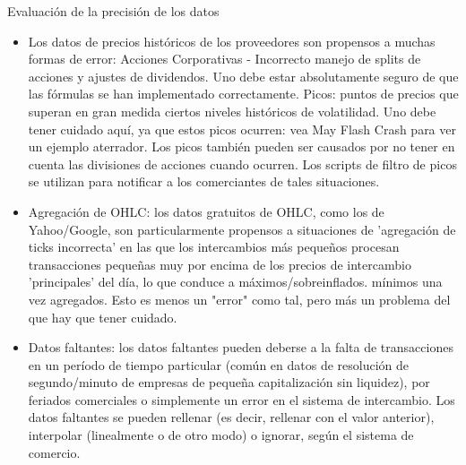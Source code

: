 \documentclass{article}
\begin{document}
 Evaluación de la precisión de los datos
\begin{itemize}
\item Los datos de precios históricos de los proveedores son propensos a muchas formas de error:
\subitem Acciones Corporativas - Incorrecto manejo de splits de acciones y ajustes de dividendos. Uno debe estar absolutamente seguro de que las fórmulas se han implementado correctamente.
\subitem Picos: puntos de precios que superan en gran medida ciertos niveles históricos de volatilidad. Uno debe tener cuidado aquí, ya que estos picos ocurren: vea May Flash Crash para ver un ejemplo aterrador. Los picos también pueden ser causados por no tener en cuenta las divisiones de acciones cuando ocurren. Los scripts de filtro de picos se utilizan para notificar a los comerciantes de tales situaciones.
\item Agregación de OHLC: los datos gratuitos de OHLC, como los de Yahoo/Google, son particularmente propensos a situaciones de 'agregación de ticks incorrecta' en las que los intercambios más pequeños procesan transacciones pequeñas muy por encima de los precios de intercambio 'principales' del día, lo que conduce a máximos/sobreinflados. mínimos una vez agregados. Esto es menos un "error" como tal, pero más un problema del que hay que tener cuidado.
\item Datos faltantes: los datos faltantes pueden deberse a la falta de transacciones en un período de tiempo particular (común en datos de resolución de segundo/minuto de empresas de pequeña capitalización sin liquidez), por feriados comerciales o simplemente un error en el sistema de intercambio. Los datos faltantes se pueden rellenar (es decir, rellenar con el valor anterior), interpolar (linealmente o de otro modo) o ignorar, según el sistema de comercio.
\end{itemize}
\end{document}
